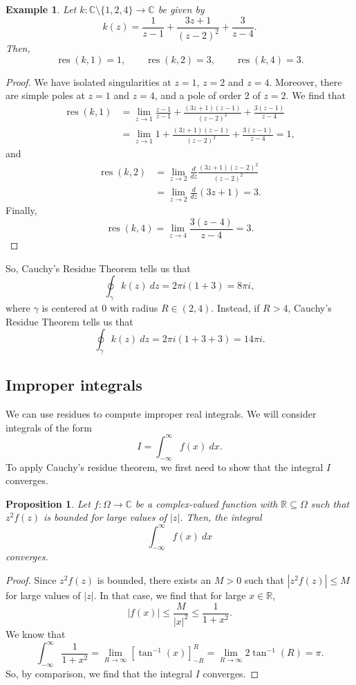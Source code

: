 \documentclass[a4paper, openany]{memoir}
\theoremstyle{definition}
\theoremstyle{plain}
\newtheorem{proposition}[definition]{Proposition}
\newtheorem{example}[definition]{Example}
\begin{document}
\begin{example}
    Let $k: \mathbb{C} \setminus \{1, 2, 4\} \to \mathbb{C}$ be given by
    \[k(z) = \frac{1}{z - 1} + \frac{3z + 1}{(z - 2)^2} + \frac{3}{z - 4}.\]
    Then,
    \[\operatorname{res}(k, 1) = 1, \qquad \operatorname{res}(k, 2) = 3, \qquad \operatorname{res}(k, 4) = 3.\]
\end{example}
\begin{proof}
    We have isolated singularities at $z = 1$, $z = 2$ and $z = 4$. Moreover, there are simple poles at $z = 1$ and $z = 4$, and a pole of order 2 of $z = 2$. We find that
    \begin{align*}
        \operatorname{res}(k, 1) &= \lim_{z \to 1} \frac{z-1}{z-1} + \frac{(3z + 1)(z-1)}{(z - 2)^2} + \frac{3(z-1)}{z - 4} \\
        &= \lim_{z \to 1} 1 + \frac{(3z + 1)(z-1)}{(z - 2)^2} + \frac{3(z-1)}{z - 4} = 1,
    \end{align*}
    and
    \begin{align*}
        \operatorname{res}(k, 2) &= \lim_{z \to 2} \frac{d}{dz} \frac{(3z + 1)(z-2)^2}{(z-2)^2} \\
        &= \lim_{z \to 2} \frac{d}{dz} (3z + 1) = 3.
    \end{align*}
    Finally,
    \[\operatorname{res}(k, 4) = \lim_{z \to 4} \frac{3(z-4)}{z - 4} = 3.\]
\end{proof}
So, Cauchy's Residue Theorem tells us that
\[\oint_\gamma k(z) \ dz = 2\pi i (1 + 3) = 8\pi i,\]
where $\gamma$ is centered at $0$ with radius $R \in (2, 4)$. Instead, if $R > 4$, Cauchy's Residue Theorem tells us that
\[\oint_\gamma k(z) \ dz = 2\pi i (1 + 3 + 3) = 14\pi i.\]

\subsection{Improper integrals}
We can use residues to compute improper real integrals. We will consider integrals of the form
\[I = \int_{-\infty}^\infty f(x) \ dx.\]
To apply Cauchy's residue theorem, we first need to show that the integral $I$ converges.
\begin{proposition}
    Let $f: \Omega \to \mathbb{C}$ be a complex-valued function with $\mathbb{R} \subseteq \Omega$ such that $z^2 f(z)$ is bounded for large values of $|z|$. Then, the integral
    \[\int_{-\infty}^\infty f(x) \ dx\]
    converges.
\end{proposition}
\begin{proof}
    Since $z^2 f(z)$ is bounded, there exists an $M > 0$ such that $|z^2 f(z)| \leq M$ for large values of $|z|$. In that case, we find that for large $x \in \mathbb{R}$,
    \[|f(x)| \leq \frac{M}{|x|^2} \leq \frac{1}{1 + x^2}.\]
    We know that
    \[\int_{-\infty}^\infty \frac{1}{1 + x^2} = \lim_{R \to \infty} \left[\tan^{-1}(x)\right]_{-R}^{R} = \lim_{R \to \infty} 2\tan^{-1}(R) = \pi.\]
    So, by comparison, we find that the integral $I$ converges.
\end{proof}
\end{document}
